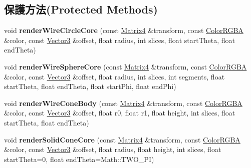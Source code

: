 \subsection*{保護方法(Protected Methods)}
\begin{DoxyCompactItemize}
\item 
void {\bfseries render\+Wire\+Circle\+Core} (const \hyperlink{class_magnum_1_1_matrix4}{Matrix4} \&transform, const \hyperlink{class_magnum_1_1_color_r_g_b_a}{Color\+R\+G\+BA} \&color, const \hyperlink{class_magnum_1_1_vector3}{Vector3} \&offset, float radius, int slices, float start\+Theta, float end\+Theta)\hypertarget{class_magnum_1_1_i_component_debug_renderer_ac2378fa2554436b2b18b2f501f80a0fa}{}\label{class_magnum_1_1_i_component_debug_renderer_ac2378fa2554436b2b18b2f501f80a0fa}

\item 
void {\bfseries render\+Wire\+Sphere\+Core} (const \hyperlink{class_magnum_1_1_matrix4}{Matrix4} \&transform, const \hyperlink{class_magnum_1_1_color_r_g_b_a}{Color\+R\+G\+BA} \&color, const \hyperlink{class_magnum_1_1_vector3}{Vector3} \&offset, float radius, int slices, int segments, float start\+Theta, float end\+Theta, float start\+Phi, float end\+Phi)\hypertarget{class_magnum_1_1_i_component_debug_renderer_ae6684ae1d93748b74353b1e4539ee279}{}\label{class_magnum_1_1_i_component_debug_renderer_ae6684ae1d93748b74353b1e4539ee279}

\item 
void {\bfseries render\+Wire\+Cone\+Body} (const \hyperlink{class_magnum_1_1_matrix4}{Matrix4} \&transform, const \hyperlink{class_magnum_1_1_color_r_g_b_a}{Color\+R\+G\+BA} \&color, const \hyperlink{class_magnum_1_1_vector3}{Vector3} \&offset, float r0, float r1, float height, int slices, float start\+Theta, float end\+Theta)\hypertarget{class_magnum_1_1_i_component_debug_renderer_a924cffd2c7414a53e11bf7ef190265ae}{}\label{class_magnum_1_1_i_component_debug_renderer_a924cffd2c7414a53e11bf7ef190265ae}

\item 
void {\bfseries render\+Solid\+Cone\+Core} (const \hyperlink{class_magnum_1_1_matrix4}{Matrix4} \&transform, const \hyperlink{class_magnum_1_1_color_r_g_b_a}{Color\+R\+G\+BA} \&color, const \hyperlink{class_magnum_1_1_vector3}{Vector3} \&offset, float radius, float height, int slices, float start\+Theta=0, float end\+Theta=Math\+::\+T\+W\+O\+\_\+\+PI)\hypertarget{class_magnum_1_1_i_component_debug_renderer_a9394b6dd4981ca76578ffd079b59e3a1}{}\label{class_magnum_1_1_i_component_debug_renderer_a9394b6dd4981ca76578ffd079b59e3a1}


\end{DoxyCompactItemize}
